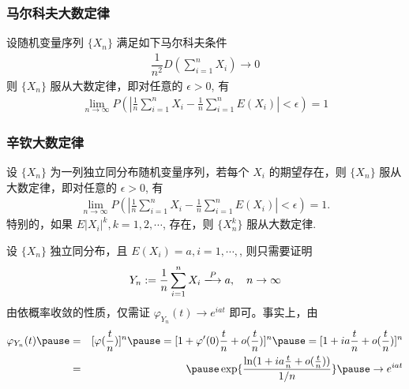 \begin{frame}
	\frametitle{马尔科夫大数定律}
	\begin{thm}
		设随机变量序列 $\{X_n\}$ 满足如下马尔科夫条件
		\begin{eqnarray*}
			\dfrac{1}{n^2}D(\sum_{i=1}^nX_i)\rightarrow 0
		\end{eqnarray*}
		则 $\{X_n\}$ 服从大数定律，即对任意的 $\epsilon>0$, 有
		\begin{eqnarray*}
			\lim_{n\rightarrow\infty}P(|\frac{1}{n}\sum_{i=1}^nX_i-\frac{1}{n}\sum_{i=1}^nE(X_i)|<\epsilon)=1
		\end{eqnarray*}
	\end{thm}
\end{frame}
\begin{frame}
	\frametitle{辛钦大数定律}
	\begin{thm}
		设 $\{X_n\}$ 为一列独立同分布随机变量序列，若每个 $X_i$ 的期望存在，则 $\{X_n\}$ 服从大数定律，即对任意的 $\epsilon>0$, 有
		\begin{eqnarray*}
			\lim_{n\rightarrow\infty}P(|\frac{1}{n}\sum_{i=1}^nX_i-\frac{1}{n}\sum_{i=1}^nE(X_i)|<\epsilon)=1.
		\end{eqnarray*}
		特别的，如果 $E|X_i|^k, k=1,2,\cdots$, 存在，则 $\{X_n^k\}$ 服从大数定律.
	\end{thm}

	\pause%
	\zheng 设 $\{X_n\}$ 独立同分布，且 $E (X_i)=a, i=1,\cdots,$, 则只需要证明
	\begin{eqnarray*}
		Y_n:=\dfrac{1}{n}\sum_{i=1}^nX_i\xlongrightarrow{P}a, \quad n\rightarrow \infty
	\end{eqnarray*}
	\pause 由依概率收敛的性质，仅需证 $\varphi_{Y_n}(t)\rightarrow e^{iat}$ 即可。事实上，由
	\pause \begin{eqnarray*}
		\varphi_{Y_n}(t)\pause &=&[\varphi(\frac{t}{n})]^n\pause =[1+\varphi'(0)\frac{t}{n}+o(\frac{t}{n})]^n\pause =[1+ia\frac{t}{n}+o(\frac{t}{n})]^n\\
		&=&\pause \exp\{\dfrac{\ln (1+ia\frac{t}{n}+o(\frac{t}{n}))}{1/n}\}\pause \rightarrow e^{iat}
	\end{eqnarray*}

\end{frame}


